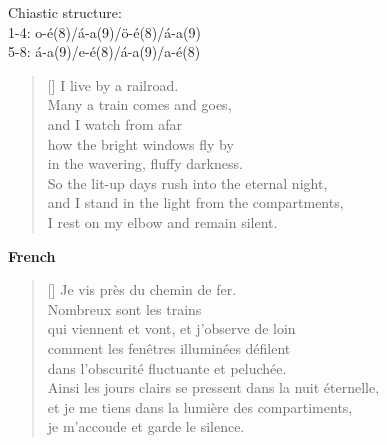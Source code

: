 \documentclass[a4paper,12pt,twoside,final]{book}
\begin{document}

\noindent Chiastic structure: \\
1-4: o-é(8)/á-a(9)/ö-é(8)/á-a(9) \\
5-8: á-a(9)/e-é(8)/á-a(9)/a-é(8)

\newpage



\settowidth{\versewidth}{and I stand in the light from the compartments,}

\begin{verse}[\versewidth]
  I live by a railroad. \\
  Many a train comes and goes, \\
  and I watch from afar \\
  how the bright windows fly by \\
  in the wavering, fluffy darkness. \\
  So the lit-up days rush into the eternal night, \\
  and I stand in the light from the compartments, \\
  I rest on my elbow and remain silent. \\
\end{verse}

\bigskip

\noindent \textbf{French}


\settowidth{\versewidth}{Ainsi les jours clairs se pressent dans la nuit éternelle,}

\begin{verse}[\versewidth]
  Je vis près du chemin de fer. \\
  Nombreux sont les trains \\
  qui viennent et vont, et j'observe de loin \\
  comment les fenêtres illuminées défilent \\
  dans l'obscurité fluctuante et peluchée. \\
  Ainsi les jours clairs se pressent dans la nuit éternelle, \\
  et je me tiens dans la lumière des compartiments, \\
  je m'accoude et garde le silence. \\
\end{verse}

\newpage

\end{document}
